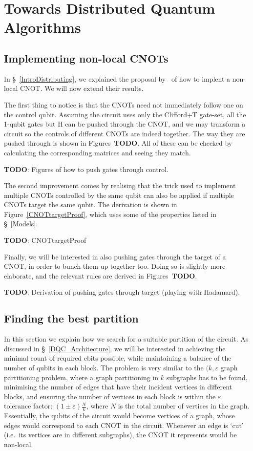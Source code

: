\chapter{Towards Distributed Quantum Algorithms}
\label{chap:Project}

\section{Implementing non-local CNOTs}
\label{NonLocalGates}

In \S~\ref{IntroDistributing}, we explained the proposal by~\citet{NonLocalCNOT} of how to implent a non-local CNOT. We will now extend their results.

The first thing to notice is that the CNOTs need not immediately follow one on the control qubit. Assuming the circuit uses only the Clifford+T gate-set, all the 1-qubit gates but H can be pushed through the CNOT, and we may transform a circuit so the controls of different CNOTs are indeed together. The way they are pushed through is shown in Figures~\textbf{TODO}. All of these can be checked by calculating the corresponding matrices and seeing they match.

\textbf{TODO}: Figures of how to push gates through control.

The second improvement comes by realising that the trick used to implement multiple CNOTs controlled by the same qubit can also be applied if multiple CNOTs target the same qubit. The derivation is shown in Figure~\ref{CNOTtargetProof}, which uses some of the properties listed in \S~\ref{Models}.

\textbf{TODO}: CNOTtargetProof

Finally, we will be interested in also pushing gates through the target of a CNOT, in order to bunch them up together too. Doing so is slightly more elaborate, and the relevant rules are derived in Figures~\textbf{TODO}.

\textbf{TODO}: Derivation of pushing gates through target (playing with Hadamard).



\section{Finding the best partition}

In this section we explain how we search for a suitable partition of the circuit. As discussed in \S~\ref{DQC_Architecture}, we will be interested in achieving the minimal count of required ebits possible, while maintaining a balance of the number of qubits in each block. The problem is very similar to the \((k,\varepsilon\) graph partitioning problem, where a graph partitioning in \(k\) subgraphs has to be found, minimising the number of edges that have their incident vertices in different blocks, and ensuring the number of vertices in each block is within the \(\varepsilon\) tolerance factor: \((1 \pm \varepsilon)\frac{N}{k}\), where \(N\) is the total number of vertices in the graph. Essentially, the qubits of the circuit would become vertices of a graph, whose edges would correspond to each CNOT in the circuit. Whenever an edge is `cut' (i.e.\ its vertices are in different subgraphs), the CNOT it represents would be non-local.

